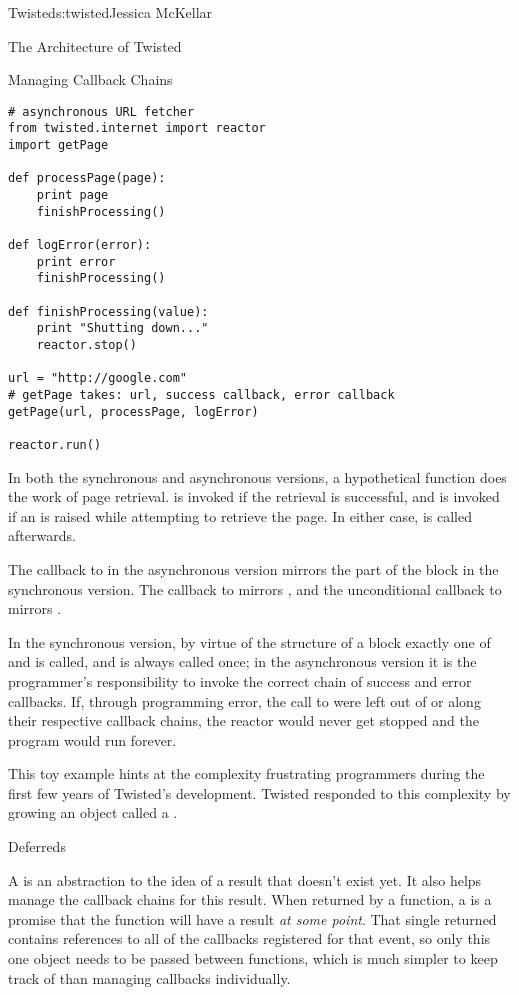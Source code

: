 \begin{aosachapter}{Twisted}{s:twisted}{Jessica McKellar}
\begin{aosasect1}{The Architecture of Twisted}
\begin{aosasect2}{Managing Callback Chains}
\begin{verbatim}
# asynchronous URL fetcher
from twisted.internet import reactor
import getPage

def processPage(page):
    print page
    finishProcessing()

def logError(error):
    print error
    finishProcessing()

def finishProcessing(value):
    print "Shutting down..."
    reactor.stop()

url = "http://google.com"
# getPage takes: url, success callback, error callback
getPage(url, processPage, logError)

reactor.run()
\end{verbatim}

In both the synchronous and asynchronous versions, a hypothetical
 function does the work of page
retrieval.  is invoked if the retrieval is successful,
and  is invoked if an  is raised
while attempting to retrieve the page. In either case,
 is called afterwards.

The callback to  in the asynchronous version mirrors the
 part of the  block in the synchronous
version. The callback to  mirrors , and
the unconditional callback to  mirrors
.

In the synchronous version, by virtue of the structure of a
 block exactly one of  and
 is called, and  is always
called once; in the asynchronous version it is the programmer's responsibility
to invoke the correct chain of success and error callbacks. If, through
programming error, the call to  were left out of
 or  along their respective
callback chains, the reactor would never get stopped and the program would run
forever.

This toy example hints at the complexity frustrating programmers during the
first few years of Twisted's development. Twisted responded to this complexity
by growing an object called a .

\begin{aosasect3}{Deferreds}

A  is an abstraction to the idea of a result that
doesn't exist yet. It also helps manage the callback chains for this
result. When returned by a function, a  is a promise
that the function will have a result \emph{at some point}. That single
returned  contains references to all of the callbacks
registered for that event, so only this one object needs to be passed
between functions, which is much simpler to keep track of than
managing callbacks individually.


\end{aosasect3}
\end{aosasect2}
\end{aosasect1}
\end{aosachapter}
